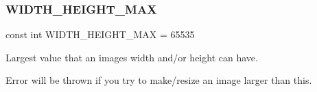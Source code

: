 \subsubsection{\texorpdfstring{W\+I\+D\+T\+H\+\_\+\+H\+E\+I\+G\+H\+T\+\_\+\+M\+AX}{WIDTH\_HEIGHT\_MAX}}
{\footnotesize\ttfamily const int W\+I\+D\+T\+H\+\_\+\+H\+E\+I\+G\+H\+T\+\_\+\+M\+AX = 65535\hspace{0.3cm}{\ttfamily [static]}}



Largest value that an image\textquotesingle{}s width and/or height can have. 

Error will be thrown if you try to make/resize an image larger than this. 